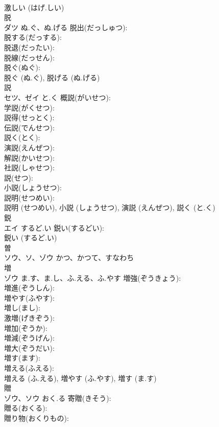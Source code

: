 \documentclass[8pt]{extreport}
\begin{document}
\begin{CJK}{UTF8}{min}
\\	激しい (はげ.しい)
\\	脱			
\\	ダツ	ぬ.ぐ、ぬ.げる	脱出(だっしゅつ): 
\\	脱する(だっする): 
\\	脱退(だったい): 
\\	脱線(だっせん): 
\\	脱ぐ(ぬぐ): 
\\	脱ぐ (ぬ.ぐ), 脱げる (ぬ.げる)
\\	説			
\\	セツ、ゼイ	と.く	概説(がいせつ): 
\\	学説(がくせつ): 
\\	説得(せっとく): 
\\	伝説(でんせつ): 
\\	説く(とく): 
\\	演説(えんぜつ): 
\\	解説(かいせつ): 
\\	社説(しゃせつ): 
\\	説(せつ): 
\\	小説(しょうせつ): 
\\	説明(せつめい): 
\\	説明 (せつめい), 小説 (しょうせつ), 演説 (えんぜつ), 説く (と.く)
\\	鋭		
\\	エイ	するど.い	鋭い(するどい): 
\\	鋭い (するど.い)
\\	曽		
\\	ソウ、ソ、ゾウ	かつ、かつて、すなわち		
\\	増			
\\	ゾウ	ま.す、ま.し、ふ.える、ふ.やす	増強(ぞうきょう): 
\\	増進(ぞうしん): 
\\	増やす(ふやす): 
\\	増し(まし): 
\\	激増(げきぞう): 
\\	増加(ぞうか): 
\\	増減(ぞうげん): 
\\	増大(ぞうだい): 
\\	増す(ます): 
\\	増える(ふえる): 
\\	増える (ふ.える), 増やす (ふ.やす), 増す (ま.す)
\\	贈			
\\	ゾウ、ソウ	おく.る	寄贈(きそう): 
\\	贈る(おくる): 
\\	贈り物(おくりもの): 

\end{CJK}
\end{document}

